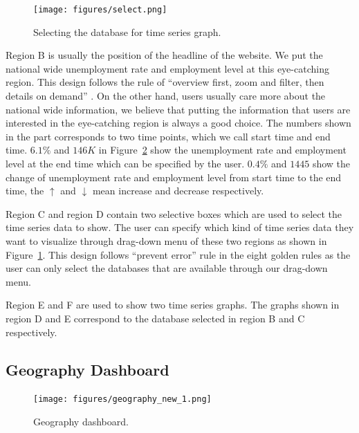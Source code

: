 \documentclass{sigchi}
\begin{document}
\begin{figure}[!htbp]
\centering
\texttt{[image: figures/select.png]}
\caption{Selecting the database for time series graph.}
\label{fig:select}
\end{figure}

Region B is usually the position of the headline of the website. We put the national wide unemployment rate and employment level at this eye-catching region. This design follows the rule of ``overview first, zoom and filter, then details on demand'' \cite{overview}. On the other hand, users usually care more about the national wide information, we believe that putting the information that users are interested in the eye-catching region is always a good choice. The numbers shown in the part corresponds to two time points, which we call start time and end time. $6.1\%$ and $146K$ in Figure~\ref{fig:Geography} show the unemployment rate and employment level at the end time which can be specified by the user. $0.4\%$ and $1445$ show the change of unemployment rate and employment level from start time to the end time, the $\uparrow$ and $\downarrow$ mean increase and decrease respectively.

Region C and region D contain two selective boxes which are used to select the time series data to show. The user can specify which kind of time series data they want to visualize through drag-down menu of these two regions as shown in Figure~\ref{fig:select}. This design follows ``prevent error'' rule in the eight golden rules \cite{eight} as the user can only select the databases that are available through our drag-down menu.

Region E and F are used to show two time series graphs. The graphs shown in region D and E correspond to the  database selected in region B and C respectively.



\subsection{Geography Dashboard}

\begin{figure}[!htbp]
\centering
\texttt{[image: figures/geography\_new\_1.png]}
\caption{Geography dashboard.}
\label{fig:Geography}
\end{figure}
\end{document}
